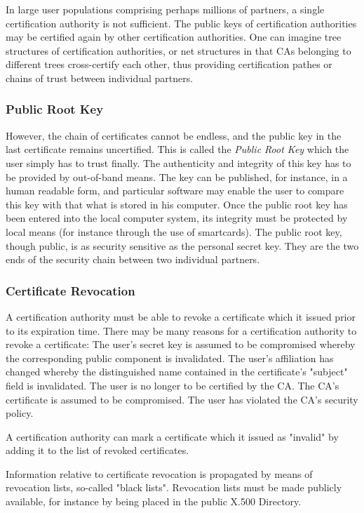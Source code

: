 In large user populations comprising perhaps millions of partners, a single certification 
authority is not sufficient. The public keys of certification authorities may be 
certified again by other certification authorities. One can imagine tree structures 
of certification authorities, or net structures in that CAs belonging to different trees
cross-certify each other, thus providing certification pathes or chains of trust 
between individual partners. 

\subsubsection{Public Root Key}
However, the chain of certificates cannot be endless, and the public key in the last 
certificate remains uncertified. This is called the {\em Public Root Key} which the 
user simply has
to trust finally. The authenticity and integrity of this key has to be provided by 
out-of-band means. The key can be published,  for instance, in a human readable form, 
and particular software may enable the user to compare this key with that what is stored
in his computer. Once the public root key has been entered into the local computer
system, its integrity must be protected by local means (for instance
through the use of smartcards). The public root key, though public, is as security
sensitive as the personal secret key. They are the two ends of the security
chain between two individual partners.

\subsubsection{Certificate Revocation}
A certification authority must be able to revoke a certificate which it issued
prior to its expiration time. There may be many reasons for a certification authority
to revoke a certificate:
\bi
\m The user's secret key is assumed to be compromised whereby the
corresponding public component is invalidated.
\m The user's affiliation has changed whereby the distinguished
name contained in the certificate's "subject" field is invalidated.
\m The user is no longer to be certified by the CA.
\m The CA's certificate is assumed to be compromised.
\m The user has violated the CA's security policy.
\ei

A certification authority can mark a certificate which it issued as "invalid" by adding
it to the list of revoked certificates.

Information relative to certificate revocation is propagated by
means of revocation lists, so-called "black lists".
Revocation lists must be made publicly available, for instance by being placed in
the public X.500 Directory.

